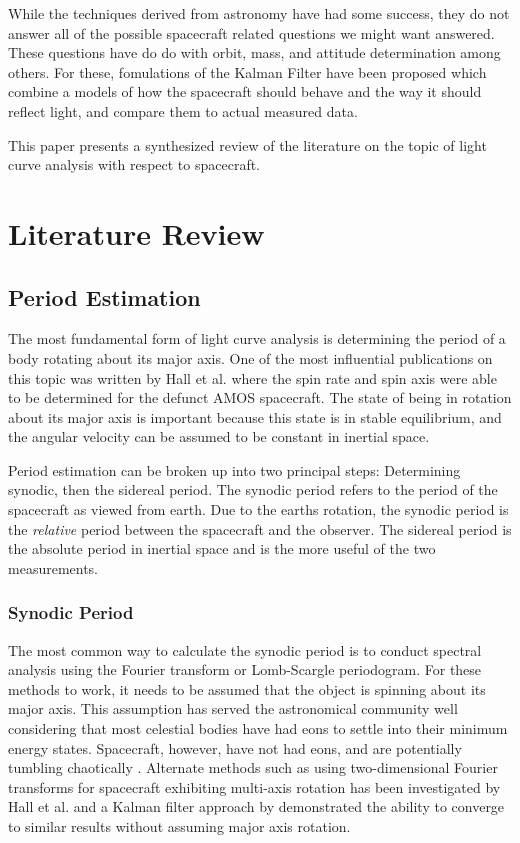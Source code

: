 \documentclass{article}
\begin{document}
While the techniques derived from astronomy have had some success, they do not answer all of the possible spacecraft related questions we might want answered. These questions have do do with orbit, mass, and attitude determination among others. For these, fomulations of the Kalman Filter have been proposed which combine a models of how the spacecraft should behave and the way it should reflect light, and compare them to actual measured data. 

This paper presents a synthesized review of the literature on the topic of light curve analysis with respect to spacecraft.

\section{Literature Review}

\subsection{Period Estimation}

The most fundamental form of light curve analysis is determining the period of a body rotating about its major axis. One of the most influential publications on this topic was written by Hall et al.\cite{AMOS} where the spin rate and spin axis were able to be determined for the defunct AMOS spacecraft. The state of being in rotation about its major axis is important because this state is in stable equilibrium, and the angular velocity can be assumed to be constant in inertial space. 

Period estimation can be broken up into two principal steps: Determining synodic, then the sidereal period. The synodic period refers to the period of the spacecraft as viewed from earth. Due to the earths rotation, the synodic period is the \textit{relative} period between the spacecraft and the observer. The sidereal period is the absolute period in inertial space and is the more useful of the two measurements. 

\subsubsection{Synodic Period}

The most common way to calculate the synodic period is to conduct spectral analysis using the Fourier transform or Lomb-Scargle periodogram. For these methods to work, it needs to be assumed that the object is spinning about its major axis. This assumption has served the astronomical community well considering that most celestial bodies have had eons to settle into their minimum energy states. Spacecraft, however, have not had eons, and are potentially tumbling chaotically \cite{AMOS}. Alternate methods such as using two-dimensional Fourier transforms for spacecraft exhibiting multi-axis rotation has been investigated by Hall et al. \cite{Hall2014OpticalCO} and a Kalman filter approach by \cite{AttitudeEstimationFromLightCurve} demonstrated the ability to converge to similar results without assuming major axis rotation.
\end{document}
